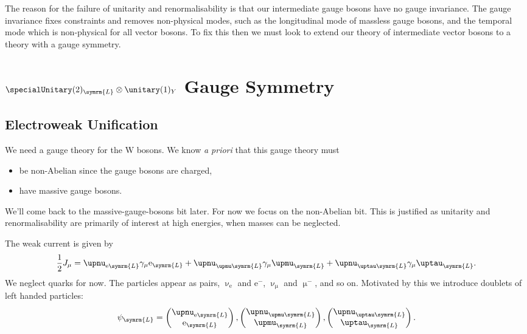 \documentclass[fleqn]{NotesClass}
\newcommand{\Pparticle}[1]{\mathrm{#1}}
\newcommand{\Pe}{\ensuremath{\Pparticle{e}^{-}}}
\newcommand{\Pex}{\ensuremath{\Pparticle{e}}}
\newcommand{\Pmu}{\ensuremath{\upmu^{-}}}
\newcommand{\Pmux}{\ensuremath{\upmu}}
\newcommand{\Ptaux}{\ensuremath{\uptau}}
\newcommand{\Pnu}{\ensuremath{\upnu}}
\newcommand{\Pnue}{\ensuremath{\upnu_{\mathrm{e}}}}
\newcommand{\Pnumu}{\ensuremath{\upnu_{\upmu}}}
\newcommand{\PW}{\ensuremath{\Pparticle{W}}}
\newcommand{\APnu}{\ensuremath{\upnu}}
\newcommand{\Left}{\symrm{L}}
\begin{document}
    The reason for the failure of unitarity and renormalisability is that our intermediate gauge bosons have no gauge invariance.
    The gauge invariance fixes constraints and removes non-physical modes, such as the longitudinal mode of massless gauge bosons, and the temporal mode which is non-physical for all vector bosons.
    To fix this then we must look to extend our theory of intermediate vector bosons to a theory with a gauge symmetry.
    
    \chapter{\texorpdfstring{\(\specialUnitary(2)_{\Left} \otimes \unitary(1)_{Y}\)}{SU(2)L x U(1)Y} Gauge Symmetry}
    \section{Electroweak Unification}
    We need a gauge theory for the \PW{} bosons.
    We know \textit{a priori} that this gauge theory must
    \begin{itemize}
        \item be non-Abelian since the gauge bosons are charged,
        \item have massive gauge bosons.
    \end{itemize}
    We'll come back to the massive-gauge-bosons bit later.
    For now we focus on the non-Abelian bit.
    This is justified as unitarity and renormalisability are primarily of interest at high energies, when masses can be neglected.
    
    The weak current is given by
    \begin{equation}
        \frac{1}{2}J_\mu = \APnu_{\Pex\Left} \gamma_\mu \Pex_{\Left} + \APnu_{\Pmux\Left} \gamma_\mu \Pmux_{\Left} + \APnu_{\Ptaux\Left} \gamma_\mu \Ptaux_{\Left}.
    \end{equation}
    We neglect quarks for now.
    The particles appear as pairs, \(\Pnue\) and \(\Pe\), \(\Pnumu\) and \(\Pmu\), and so on.
    Motivated by this we introduce doublets of left handed particles:
    \begin{equation}
        \psi_{\Left} =
        \begin{pmatrix}
            \Pnu_{\Pex\Left}\\ \Pex_{\Left}
        \end{pmatrix}
        ,
        \begin{pmatrix}
            \Pnu_{\Pmux\Left}\\ \Pmux_{\Left}
        \end{pmatrix}
        ,
        \begin{pmatrix}
            \Pnu_{\Ptaux\Left}\\ \Ptaux_{\Left}
        \end{pmatrix}
        .
    \end{equation}
    
\end{document}
